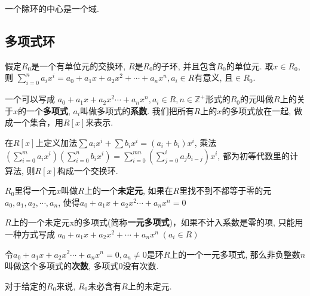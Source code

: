 \begin{Proposition}
一个除环的中心是一个域.
\end{Proposition}

\subsection{多项式环} %
\begin{Note}
假定$R_0$是一个有单位元的交换环, $R$是$R_0$的子环, 并且包含$R_0$的单位元. 取$x \in R_0$, 则
$ \displaystyle \sum_{i=0}^n a_i x^i = a_0 + a_1 x + a_2 x^2 + \cdots + a_n x^n, a_i \in R $有意义, 且$\in R_0$.
\end{Note}

\begin{Definition}[多项式]
一个可以写成 $ a_0 + a_1 x + a_2 x^2 \cdots + a_n x^n, a_i \in R, n \in \mathbb{Z}^+ $形式的$R_0$的元叫做$R$上的关于$x$的一个\textbf{多项式}, $a_i$叫做多项式的\textbf{系数}. 我们把所有$R$上的$x$的多项式放在一起, 做成一个集合，用$R[x]$来表示.
\end{Definition}

\begin{Note}[环上的多项式构成一个环]
在$R[x]$上定义加法$\displaystyle \sum a_i x^i + \sum b_i x^i = (a_i + b_i) x^i$, 乘法
$\displaystyle \left(\sum_{i=0}^m a_i x^i \right) \left( \sum_{i=0}^{n} b_i x^i \right) 
= \sum_{i=0}^{mn} \left(\sum_{j=0}^i a_j b_{i-j} \right) x^i$, 都为初等代数里的计算法, 则$R[x]$构成一个交换环.
\end{Note}

\begin{Definition}[未定元]
$R_0$里得一个元$x$叫做$R$上的一个\textbf{未定元}, 如果在$R$里找不到不都等于零的元
$a_0, a_1, a_2, \cdots, a_n$, 使得$a_0 + a_1 x + a_2 x^2 \cdots + a_n x^n = 0$
\end{Definition}

\begin{Proposition}
$R$上的一个未定元x的多项式(简称\textbf{一元多项式})，如果不计入系数是零的项, 只能用一种方式写成
$a_0 + a_1 x + a_2 x^2 + \cdots + a_n x^n \; (a_i \in R)$
\end{Proposition}

\begin{Definition}[多项式的次数]
令$a_0 + a_1 x + a_2 x^2 \cdots + a_n x^n = 0, a_n \neq \mathfrak{0}$是环$R$上的一个一元多项式,
那么非负整数$n$叫做这个多项式的\textbf{次数}, 多项式$\mathfrak{0}$没有次数.
\end{Definition}

\begin{Proposition}
对于给定的$R_0$来说, $R_0$未必含有$R$上的未定元.
\end{Proposition}


